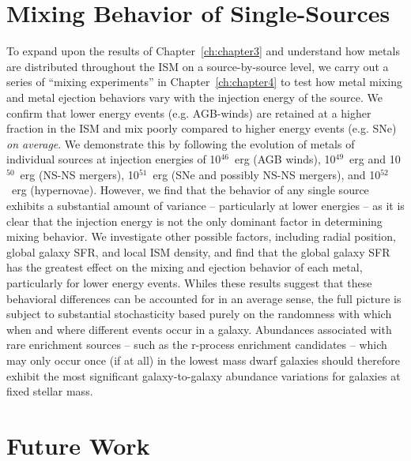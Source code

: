 \section{Mixing Behavior of Single-Sources}
\label{conclusion:sec:ch4}

To expand upon the results of Chapter~\ref{ch:chapter3} and understand how metals are distributed throughout the ISM on a source-by-source level, we carry out a series of ``mixing experiments'' in Chapter~\ref{ch:chapter4} to test how metal mixing and metal ejection behaviors vary with the injection energy of the source. We confirm that lower energy events (e.g. AGB-winds) are retained at a higher fraction in the ISM and mix poorly compared to higher energy events (e.g. SNe) \textit{on average}. We demonstrate this by following the evolution of metals of individual sources at injection energies of 10$^{46}$~erg (AGB winds), 10$^{49}$~erg and 10$^{50}$~erg (NS-NS mergers), 10$^{51}$~erg (SNe and possibly NS-NS mergers), and 10$^{52}$~erg (hypernovae). However, we find that the behavior of any single source exhibits a substantial amount of variance -- particularly at lower energies -- as it is clear that the injection energy is not the only dominant factor in determining mixing behavior. We investigate other possible factors, including radial position, global galaxy SFR, and local ISM density, and find that the global galaxy SFR has the greatest effect on the mixing and ejection behavior of each metal, particularly for lower energy events. Whiles these results suggest that these behavioral differences can be accounted for in an average sense, the full picture is subject to substantial stochasticity based purely on the randomness with which when and where different events occur in a galaxy. Abundances associated with rare enrichment sources -- such as the r-process enrichment candidates -- which may only occur once (if at all) in the lowest mass dwarf galaxies should therefore exhibit the most significant galaxy-to-galaxy abundance variations for galaxies at fixed stellar mass.

\section{Future Work}
\label{conclusion:sec:future}

